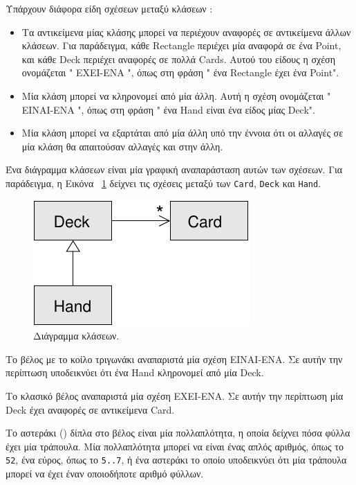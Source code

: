 \documentclass[10pt]{book}
\begin{document}
Υπάρχουν διάφορα είδη σχέσεων μεταξύ κλάσεων : 

\begin{itemize}

\item Τα αντικείμενα μίας κλάσης μπορεί να περιέχουν αναφορές σε αντικείμενα άλλων 
κλάσεων.  Για παράδειγμα, κάθε  Rectangle  περιέχει μία αναφορά σε ένα  Point, 
 και κάθε  Deck  περιέχει αναφορές σε πολλά  Cards.   Αυτού του είδους η σχέση ονομάζεται  " ΕΧΕΙ-ΕΝΑ ",  όπως στη φράση  " ένα  Rectangle     έχει ένα  Point". 

\item Μία κλάση μπορεί να κληρονομεί από μία άλλη.  Αυτή η σχέση ονομάζεται  " 
ΕΙΝΑΙ-ΕΝΑ ",  όπως στη φράση  " ένα  Hand  είναι ένα είδος μίας  Deck". 

\item Μία κλάση μπορεί να εξαρτάται από μία άλλη υπό την έννοια ότι οι αλλαγές σε 
μία κλάση θα απαιτούσαν αλλαγές και στην άλλη.

\end{itemize}

Ένα διάγραμμα κλάσεων είναι μία γραφική αναπαράσταση αυτών των σχέσεων.  Για παράδειγμα, 
η Εικόνα~ \ref{fig.class1}  δείχνει τις σχέσεις μεταξύ των  {\tt Card}, {\tt Deck}  και  {\tt Hand}.  


\begin{figure}
\centerline
{\includegraphics[scale=0.8]{figs/class1.pdf}}
\caption {Διάγραμμα κλάσεων.}
\label{fig.class1}
\end{figure}


Το βέλος με το κοίλο τριγωνάκι αναπαριστά μία σχέση ΕΙΝΑΙ-ΕΝΑ.  Σε αυτήν την 
περίπτωση υποδεικνύει ότι ένα  Hand  κληρονομεί από μία  Deck.

 Το κλασικό βέλος αναπαριστά μία σχέση ΕΧΕΙ-ΕΝΑ. Σε αυτήν την περίπτωση μία  
Deck  έχει αναφορές σε αντικείμενα  Card.

 Το αστεράκι  ({\tt *})  δίπλα στο βέλος είναι μία πολλαπλότητα, η οποία 
δείχνει πόσα φύλλα έχει μία τράπουλα.  Μία πολλαπλότητα μπορεί να είναι ένας απλός 
αριθμός, όπως το  {\tt 52},  ένα εύρος, όπως το  {\tt 5..7},  ή ένα αστεράκι 
το οποίο υποδεικνύει ότι μία τράπουλα μπορεί να έχει έναν οποιοδήποτε αριθμό φύλλων.
\end{document}
